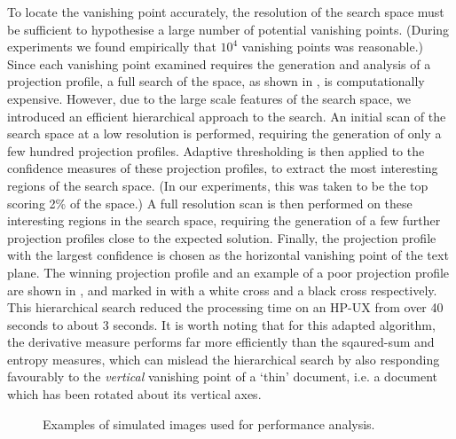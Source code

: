 {\newbyjoey To locate the vanishing point accurately, the resolution of the
search space must be sufficient to hypothesise a large number of potential
vanishing points.  (During experiments we found empirically that $10^4$
vanishing points was reasonable.) Since each vanishing point examined requires
the generation and analysis of a projection profile, a full search of the
space, as shown in , is computationally expensive.  However, due
to the large scale features of the search space, we introduced an efficient
hierarchical approach to the search.  An initial scan of the search space at a
low resolution is performed, requiring the generation of only a few hundred
projection profiles.  Adaptive thresholding is then applied to the confidence
measures of these projection profiles, to extract the most interesting regions
of the search space.  (In our experiments, this was taken to be the top scoring
2\% of the space.) A full resolution scan is then performed on these
interesting regions in the search space, requiring the generation of a few
further projection profiles close to the expected solution.  Finally, the
projection profile with the largest confidence is chosen as the horizontal
vanishing point of the text plane.  The winning projection profile and an
example of a poor projection profile are shown in , and
marked in  with a white cross and a black cross respectively.
This hierarchical search reduced the processing time on an HP-UX from over 40
seconds to about 3 seconds.
It is worth noting that for this adapted algorithm, the derivative measure
performs far more efficiently than the sqaured-sum and entropy measures, which
can mislead the hierarchical search by also responding favourably to the {\em
vertical} vanishing point of a `thin' document, i.e. a document which has been
rotated about its vertical axes.

\begin{figure}[t]
\centering
\begin{center}
\end{center}
\vspace*{-3mm}
\caption{Examples of simulated images used for performance analysis.}
\label{simimages}
\end{figure}

}
